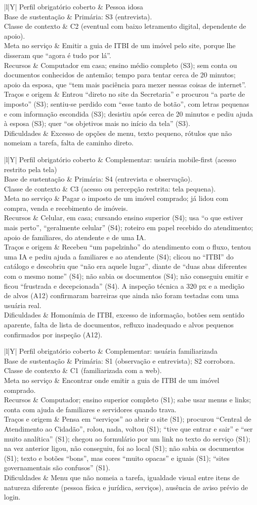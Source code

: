 \documentclass[
  12pt,
  oneside,
  a4paper,
  chapter=TITLE,
  section=TITLE,
  english,
  brazilian
]{abntex2}
\renewcommand{\fonte}[1]{\par\vspace{3pt}{\footnotesize\raggedright\noindent Fonte: #1\par}\vspace{4pt}}%
\newcommand{\persona}[9]{%
  \begin{quadro}[!htbp]
    \caption{Persona #1 --- #2}\label{qua:persona#1}
    \centering\small
    \begin{tabularx}{\textwidth}{|l|Y|}\hline
      Perfil obrigatório coberto & #3 \\\hline
      Base de sustentação & #4 \\\hline
      Classe de contexto  & #5 \\\hline
      Meta no serviço     & #6 \\\hline
      Recursos            & #7 \\\hline
      Traços e origem     & #8 \\\hline
      Dificuldades        & #9 \\\hline
    \end{tabularx}
    \fonte{Elaborado pelos autores (2026).}
  \end{quadro}}
\begin{document}
\persona{1}{Antônio, pessoa idosa}%
  {Pessoa idosa}%
  {Primária: S3 (entrevista).}%
  {C2 (eventual com baixo letramento digital, dependente de apoio).}%
  {Emitir a guia de ITBI de um imóvel pelo site, porque lhe disseram que ``agora é tudo por lá''.}%
  {Computador em casa; ensino médio completo (S3); sem conta ou documentos conhecidos de antemão; tempo para tentar cerca de 20 minutos; apoio da esposa, que ``tem mais paciência para mexer nessas coisas de internet''.}%
  {Entrou ``direto no site da Secretaria'' e procurou ``a parte de imposto'' (S3); sentiu-se perdido com ``esse tanto de botão'', com letras pequenas e com informação escondida (S3); desistiu após cerca de 20 minutos e pediu ajuda à esposa (S3); quer ``os objetivos mais no início da tela'' (S3).}%
  {Excesso de opções de menu, texto pequeno, rótulos que não nomeiam a tarefa, falta de caminho direto.}

\persona{2}{Júlia, 19 anos, usuária de celular}%
  {Complementar: usuária mobile-first (acesso restrito pela tela)}%
  {Primária: S4 (entrevista e observação).}%
  {C3 (acesso ou percepção restrita: tela pequena).}%
  {Pagar o imposto de um imóvel comprado; já lidou com compra, venda e recebimento de imóveis.}%
  {Celular, em casa; cursando ensino superior (S4); usa ``o que estiver mais perto'', ``geralmente celular'' (S4); roteiro em papel recebido do atendimento; apoio de familiares, do atendente e de uma IA.}%
  {Recebeu ``um papelzinho'' do atendimento com o fluxo, tentou uma IA e pediu ajuda a familiares e ao atendente (S4); clicou no ``ITBI'' do catálogo e descobriu que ``não era aquele lugar'', diante de ``duas abas diferentes com o mesmo nome'' (S4); não sabia os documentos (S4); não conseguiu emitir e ficou ``frustrada e decepcionada'' (S4). A inspeção técnica a 320 px e a medição de alvos (A12) confirmaram barreiras que ainda não foram testadas com uma usuária real.}%
  {Homonímia de ITBI, excesso de informação, botões sem sentido aparente, falta de lista de documentos, refluxo inadequado e alvos pequenos confirmados por inspeção (A12).}

\persona{3}{Camila, familiarizada com a web}%
  {Complementar: usuária familiarizada}%
  {Primária: S1 (observação e entrevista); S2 corrobora.}%
  {C1 (familiarizada com a web).}%
  {Encontrar onde emitir a guia de ITBI de um imóvel comprado.}%
  {Computador; ensino superior completo (S1); sabe usar menus e links; conta com ajuda de familiares e servidores quando trava.}%
  {Pensa em ``serviços'' ao abrir o site (S1); procurou ``Central de Atendimento ao Cidadão'', rolou, nada, voltou (S1); ``tive que entrar e sair'' e ``ser muito analítica'' (S1); chegou ao formulário por um link no texto do serviço (S1); na vez anterior ligou, não conseguiu, foi ao local (S1); não sabia os documentos (S1); texto e botões ``bons'', mas cores ``muito opacas'' e iguais (S1); ``sites governamentais são confusos'' (S1).}%
  {Menu que não nomeia a tarefa, igualdade visual entre itens de natureza diferente (pessoa física e jurídica, serviços), ausência de aviso prévio de login.}
\end{document}
